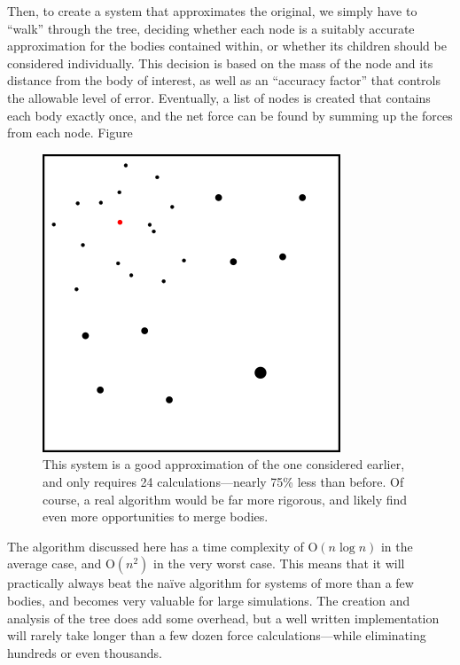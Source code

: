 \documentclass[thesis.tex]{subfiles}
\begin{document}
Then, to create a system that approximates the original, we simply have to ``walk'' through the tree, deciding whether each node is a suitably accurate approximation for the bodies contained within, or whether its children should be considered individually. This decision is based on the mass of the node and its distance from the body of interest, as well as an ``accuracy factor'' that controls the allowable level of error. Eventually, a list of nodes is created that contains each body exactly once, and the net force can be found by summing up the forces from each node. Figure

\begin{figure}[p]
	\includegraphics{imgs/treecode-nodes-final}
	\caption{This system is a good approximation of the one considered earlier, and only requires 24 calculations---nearly 75\% less than before. Of course, a real algorithm would be far more rigorous, and likely find even more opportunities to merge bodies.}
	\label{treecode-nodes-final}
\end{figure}

The algorithm discussed here has a time complexity of O$(n \log n)$ in the average case, and O$(n^2)$ in the very worst case. This means that it will practically always beat the na\"ive algorithm for systems of more than a few bodies, and becomes very valuable for large simulations. The creation and analysis of the tree does add some overhead, but a well written implementation will rarely take longer than a few dozen force calculations---while eliminating hundreds or even thousands.
\end{document}
